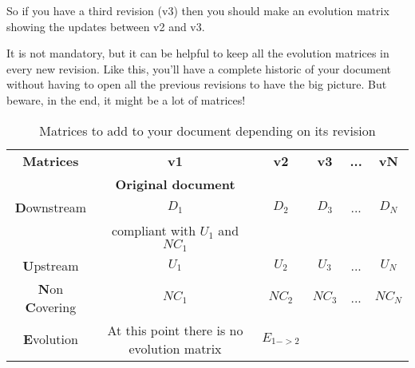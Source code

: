 So if you have a third revision (v3) then you should make an evolution matrix showing the updates between v2 and v3.

It is not mandatory, but it can be helpful to keep all the evolution matrices in every new revision. Like this, you’ll have a complete historic of your document without having to open all the previous revisions to have the big picture. But beware, in the end, it might be a lot of matrices!

\begin{table*}
	\centering
		\begin{tabular}{|c|c|c|c|c|c|}
			\hline
			\textbf{Matrices} & \textbf{v1} & \textbf{v2} & \textbf{v3} & \textbf{...} & \textbf{vN}\\
            & \textbf{Original document}& & & & \\
            \hline
            \textbf{D}ownstream & $D_1$ & $D_2$ & $D_3$ & ... & $D_N$ \\
            &compliant with $U_1$ and $NC_1$ &&&&\\
            \hline
            \textbf{U}pstream& $U_1$ & $U_2$ & $U_3$ & ... & $U_N$ \\
            \hline
            \textbf{N}on \textbf{C}overing& $NC_1$ & $NC_2$ & $NC_3$ & ... & $NC_N$ \\
            \hline
            \textbf{E}volution& At this point there is no evolution matrix& $E_{1 -> 2}$ & & & \\
            \hline
		\end{tabular}
	\caption{Matrices to add to your document depending on its revision}
	\label{tab:MatricesMatrix}
\end{table*}